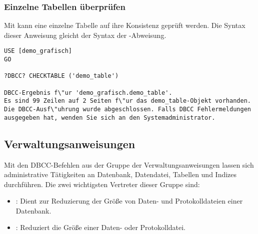         \subsubsection{Einzelne Tabellen überprüfen}
          Mit  kann eine einzelne Tabelle auf
          ihre Konsistenz geprüft werden. Die Syntax dieser Anweisung gleicht
          der Syntax der -Abweisung.
\clearpage
          \begin{lstlisting}[language=ms_sql,caption={Konsistenzprüfung
          einer einzelnen Tabelle},label=admin03_33] 
USE [demo_grafisch]
GO

?DBCC? CHECKTABLE ('demo_table')

DBCC-Ergebnis f\"ur 'demo_grafisch.demo_table'.
Es sind 99 Zeilen auf 2 Seiten f\"ur das demo_table-Objekt vorhanden.
Die DBCC-Ausf\"uhrung wurde abgeschlossen. Falls DBCC Fehlermeldungen 
ausgegeben hat, wenden Sie sich an den Systemadministrator.
          \end{lstlisting}         
          \begin{literaturinternet}
            \item \cite{ms176061}
            \item \cite{ms187332}
            \item \cite{ms174338}
            \item \cite{ms189496}
          \end{literaturinternet}
      \subsection{Verwaltungsanweisungen}
        Mit den DBCC-Befehlen aus der Gruppe der Verwaltungsanweisungen lassen
        sich administrative Tätigkeiten an Datenbank, Datendatei, Tabellen und
        Indizes durchführen. Die zwei wichtigsten Vertreter dieser Gruppe
        sind:
        \begin{itemize}
          \item {}: Dient zur Reduzierung der
          Größe von Daten- und Protokolldateien einer Datenbank.
          \item {}: Reduziert die Größe einer Daten-
          oder Protokolldatei.
       \end{itemize}
